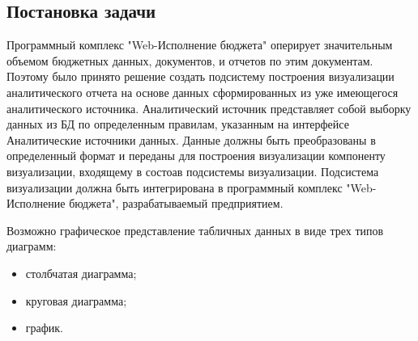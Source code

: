 \documentclass[a4paper]{extarticle}
\numberwithin{equation}{section}
\begin{document}
\subsection{Постановка задачи}
Программный комплекс "Web-Исполнение бюджета" оперирует значительным объемом бюджетных данных, документов, и отчетов по этим документам. Поэтому было принято решение создать подсистему построения визуализации аналитического отчета на основе данных сформированных из уже имеющегося аналитического источника. Аналитический источник представляет собой выборку данных из БД по определенным правилам, указанным на интерфейсе Аналитические источники данных. Данные должны быть преобразованы в определенный формат и переданы для построения визуализации компоненту визуализации, входящему в состоав подсистемы визуализации. Подсистема визуализации должна быть интегрирована в программный комплекс "Web-Исполнение бюджета", разрабатываемый предприятием.\par
Возможно графическое представление табличных данных в виде трех типов диаграмм:
\begin{itemize}
  \item столбчатая диаграмма;
  \item круговая диаграмма;
  \item график.
\end{itemize}\par
\end{document}

